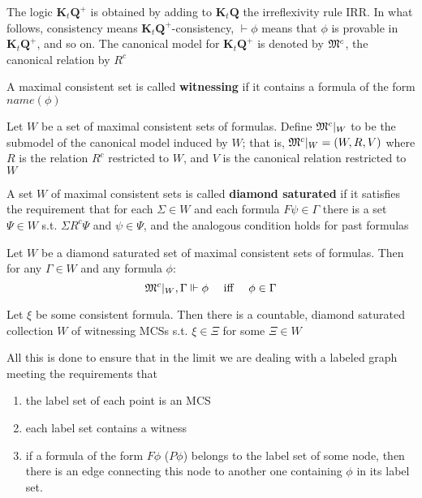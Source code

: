 \documentclass[11pt]{article}
\newcommand{\KtQ}{\textbf{K}_t\textbf{Q}}
\begin{document}
\begin{definition}[]
The logic \(\KtQ^+\) is obtained by adding to \(\KtQ\) the irreflexivity rule
IRR. In what follows, consistency means \(\KtQ^+\)-consistency,
\(\vdash\phi\) means that \(\phi\) is provable in \(\KtQ^+\), and so on. The
canonical model for \(\KtQ^+\) is denoted by \(\mathfrak{M}^c\), the canonical
relation by \(R^c\)
\end{definition}

\begin{definition}[]
A maximal consistent set is called \textbf{witnessing} if it contains a formula of the
form \(name(\phi)\)
\end{definition}

\begin{definition}[]
Let \(W\) be a set of maximal consistent sets of formulas. Define
\(\mathfrak{M}^c\vert_W\) to be the submodel of the canonical model induced by \(W\);
that is, \(\mathfrak{M}^c\vert_W=(W,R,V)\) where \(R\) is the relation \(R^c\)
restricted to \(W\), and \(V\) is the canonical relation restricted to \(W\)
\end{definition}

\begin{definition}[]
A set \(W\) of maximal consistent sets is called \textbf{diamond saturated} if it
satisfies the requirement that for each \(\Sigma\in W\) and each formula
\(F\psi\in\Gamma\) there is a set \(\Psi\in W\) s.t. \(\Sigma R^c\Psi\) and
\(\psi\in\Psi\), and the analogous condition holds for past formulas
\end{definition}


\begin{definition}
Let \(W\) be a diamond saturated set of maximal consistent sets of formulas.
Then for any \(\Gamma\in W\) and any formula \(\phi\):
\begin{equation*}
\mathfrak{M}^c\vert_W,\Gamma\Vdash\phi \quad\text{ iff }\quad
\phi\in\Gamma
\end{equation*}
\end{definition}

\begin{proposition}[]
\label{prop4.71}
Let \(\xi\) be some consistent formula. Then there is a countable, diamond
saturated collection \(W\) of witnessing MCSs s.t. \(\xi\in\Xi\) for some
\(\Xi\in W\)
\end{proposition}

All this is done to ensure that in the limit we are dealing with a labeled
graph meeting the requirements that
\begin{enumerate}
\item the label set of each point is an MCS
\item each label set contains a witness
\item if a formula of the form \(F\phi\) (\(P\phi\)) belongs to the label set of
some node, then there is an edge connecting this node to another one
containing \(\phi\) in its label set.
\end{enumerate}
\end{document}
